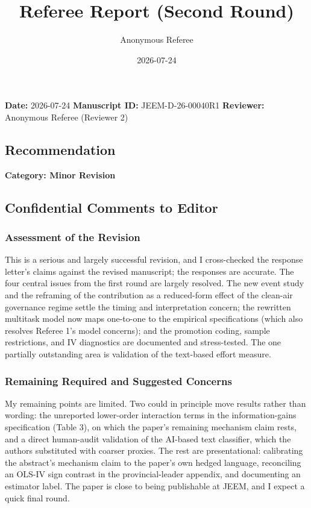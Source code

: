 \documentclass[
  11pt,
]{article}
\title{Referee Report (Second Round)}
\author{Anonymous Referee}
\date{2026-07-24}
\begin{document}
\maketitle


\textbf{Date:} 2026-07-24 \textbf{Manuscript ID:} JEEM-D-26-00040R1
\textbf{Reviewer:} Anonymous Referee (Reviewer 2)

\subsection{Recommendation}\label{recommendation}

\textbf{Category: Minor Revision}

\subsection{Confidential Comments to
Editor}\label{confidential-comments-to-editor}

\subsubsection{Assessment of the
Revision}\label{assessment-of-the-revision}

This is a serious and largely successful revision, and I cross-checked
the response letter's claims against the revised manuscript; the
responses are accurate. The four central issues from the first round are
largely resolved. The new event study and the reframing of the
contribution as a reduced-form effect of the clean-air governance regime
settle the timing and interpretation concern; the rewritten multitask
model now maps one-to-one to the empirical specifications (which also
resolves Referee 1's model concerns); and the promotion coding, sample
restrictions, and IV diagnostics are documented and stress-tested. The
one partially outstanding area is validation of the text-based effort
measure.

\subsubsection{Remaining Required and Suggested
Concerns}\label{remaining-required-and-suggested-concerns}

My remaining points are limited. Two could in principle move results
rather than wording: the unreported lower-order interaction terms in the
information-gains specification (Table 3), on which the paper's
remaining mechanism claim rests, and a direct human-audit validation of
the AI-based text classifier, which the authors substituted with coarser
proxies. The rest are presentational: calibrating the abstract's
mechanism claim to the paper's own hedged language, reconciling an
OLS-IV sign contrast in the provincial-leader appendix, and documenting
an estimator label. The paper is close to being publishable at JEEM, and
I expect a quick final round.
\end{document}

